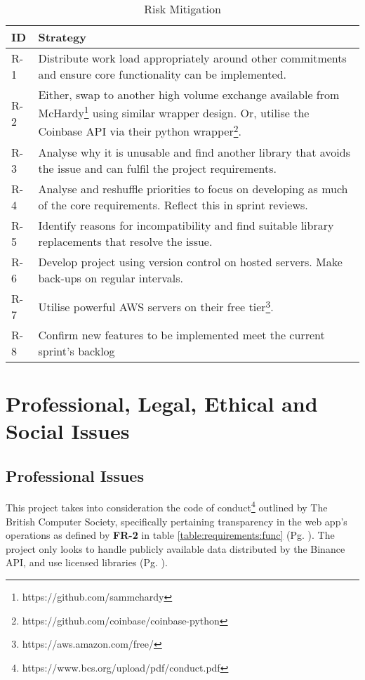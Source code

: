 \begin{table}[htb!]
\centering
\begin{tabular}{|l|p{}|}
\hline
\textbf{ID} & \textbf{Strategy} \\ \hline\hline
R-1 & Distribute work load appropriately around other commitments and ensure core functionality can be implemented. \\ \hline
R-2 & Either, swap to another high volume exchange available from McHardy\footnote{https://github.com/sammchardy} using similar wrapper design. Or, utilise the Coinbase API via their python wrapper\footnote{https://github.com/coinbase/coinbase-python}. \\ \hline
R-3 & Analyse why it is unusable and find another library that avoids the issue and can fulfil the project requirements. \\ \hline
R-4 & Analyse and reshuffle priorities to focus on developing as much of the core requirements. Reflect this in sprint reviews. \\ \hline
R-5 & Identify reasons for incompatibility and find suitable library replacements that resolve the issue. \\ \hline
R-6 & Develop project using version control on hosted servers. Make back-ups on regular intervals. \\ \hline
R-7 & Utilise powerful AWS servers on their free tier\footnote{https://aws.amazon.com/free/}. \\ \hline
R-8 & Confirm new features to be implemented meet the current sprint's backlog  \\ \hline
\end{tabular}
\caption{Risk Mitigation}
\label{table:management:risk_mitigation}
\end{table}


\section{Professional, Legal, Ethical and Social Issues}
\subsection{Professional Issues}
\noindent This project takes into consideration the code of conduct\footnote{https://www.bcs.org/upload/pdf/conduct.pdf} outlined by The British Computer Society, specifically pertaining transparency in the web app's operations as defined by \textbf{FR-2} in table \ref{table:requirements:func} (Pg. \pageref{table:requirements:func}). The project only looks to handle publicly available data distributed by the Binance API, and use licensed libraries (Pg. \pageref{sec:related:developmentLibraries}).

